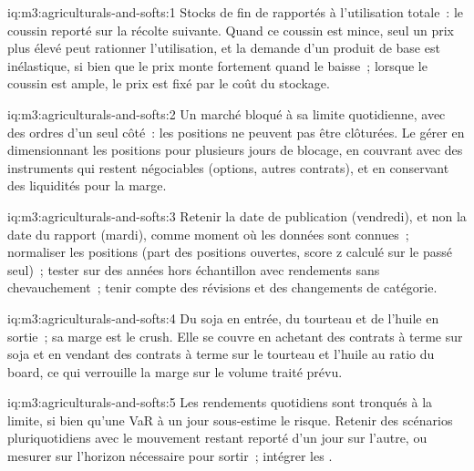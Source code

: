 \begin{solution}{iq:m3:agriculturals-and-softs:1}
Stocks de fin de  rapportés à l'utilisation totale~: le coussin reporté sur la récolte suivante. Quand ce coussin est mince, seul un
prix plus élevé peut rationner l'utilisation, et la demande d'un produit de base est inélastique, si bien que le prix monte fortement quand le
 baisse~; lorsque le coussin est ample, le prix est fixé par le coût du stockage.
\end{solution}

\begin{solution}{iq:m3:agriculturals-and-softs:2}
Un marché bloqué à sa limite quotidienne, avec des ordres d'un seul côté~: les positions ne peuvent pas être clôturées. Le gérer en dimensionnant
les positions pour plusieurs jours de blocage, en couvrant avec des instruments qui restent négociables (options, autres contrats), et en
conservant des liquidités pour la marge.
\end{solution}

\begin{solution}{iq:m3:agriculturals-and-softs:3}
Retenir la date de publication (vendredi), et non la date du rapport (mardi), comme moment où les données sont connues~; normaliser
les positions (part des positions ouvertes, score z calculé sur le passé seul)~; tester sur des années hors échantillon avec
rendements sans chevauchement~; tenir compte des révisions et des changements de catégorie.
\end{solution}

\begin{solution}{iq:m3:agriculturals-and-softs:4}
Du soja en entrée, du tourteau et de l'huile en sortie~; sa marge est le crush. Elle se couvre en achetant des contrats à terme sur soja et en vendant
des contrats à terme sur le tourteau et l'huile au ratio du board, ce qui verrouille la marge sur le volume traité prévu.
\end{solution}

\begin{solution}{iq:m3:agriculturals-and-softs:5}
Les rendements quotidiens sont tronqués à la limite, si bien qu'une VaR à un jour sous-estime le risque. Retenir des scénarios pluriquotidiens avec
le mouvement restant reporté d'un jour sur l'autre, ou mesurer sur l'horizon nécessaire pour sortir~; intégrer les .
\end{solution}


